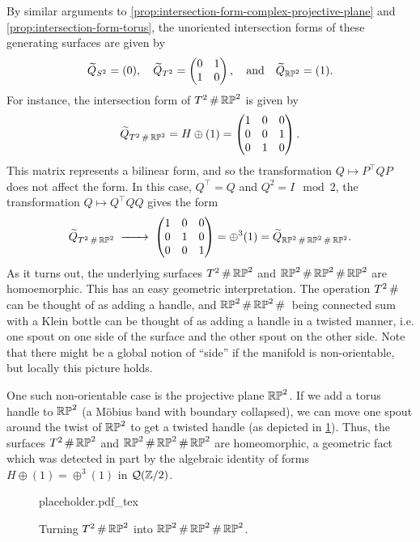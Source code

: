 By similar arguments to \cref{prop:intersection-form-complex-projective-plane} and \cref{prop:intersection-form-torus}, the unoriented intersection forms of these generating surfaces are given by
\[
	\widetilde{Q}_{S^2}=(0),\quad \widetilde{Q}_{T^2}=\begin{pmatrix}0 & 1 \\ 1 & 0\end{pmatrix},\quad \textrm{and}\quad\widetilde{Q}_{\mathbb{RP}^2} = (1).
\]
For instance, the intersection form of $T^2\+ \RP^2$ is given by
\[
	\widetilde{Q}_{T^2\+ \RP^2} = H\oplus (1)=
	\begin{pmatrix}
		1 & 0 & 0 \\
		0 & 0 & 1 \\
		0 & 1 & 0
	\end{pmatrix}.
\]
This matrix represents a bilinear form, and so the transformation $Q\mapsto P^\intercal Q P$ does not affect the form. In this case, $Q^\intercal =Q$ and $Q^2=I\mod 2$, the transformation $Q\mapsto Q^\intercal Q Q$ gives the form
\[
	\widetilde{Q}_{T^2\+ \RP^2}
	\lkxto \begin{pmatrix}
		1 & 0 & 0 \\
		0 & 1 & 0 \\
		0 & 0 & 1
	\end{pmatrix} =\oplus^3(1)= \widetilde{Q}_{\RP^2\+\RP^2\+\RP^2}.
\]
As it turns out, the underlying surfaces $T^2\+\RP^2$ and $\RP^2\+\RP^2\+\RP^2$ are homoemorphic. This has an easy geometric interpretation. The operation $T^2\+$ can be thought of as adding a handle, and $\RP^2\+\RP^2\+$ being connected sum with a Klein bottle can be thought of as adding a handle in a twisted manner, i.e. one spout on one side of the surface and the other spout on the other side. Note that there might be a global notion of ``side'' if the manifold is non-orientable, but locally this picture holds.

One such non-orientable case is the projective plane $\mathbb{RP}^2$. If we add a torus handle to $\mathbb{RP}^2$ (a M\"obius band with boundary collapsed), we can move one spout around the twist of $\mathbb{RP}^2$ to get a twisted handle (as depicted in \cref{fig:twisted-handle-to-handle}). Thus, the surfaces $T^2\+\RP^2$ and $\RP^2\+\RP^2\+\RP^2$ are homeomorphic, a geometric fact which was detected in part by the algebraic identity of forms $H\oplus (1)=\oplus^3(1)$ in $\mathcal{Q}(\mathbb{Z}/2)$.

\begin{figure}[ht]
	\centering
	{placeholder.pdf_tex}
	\caption{Turning $T^2\+\RP^2$ into $\RP^2\+\RP^2\+\RP^2$.}\label{fig:twisted-handle-to-handle}
\end{figure}

